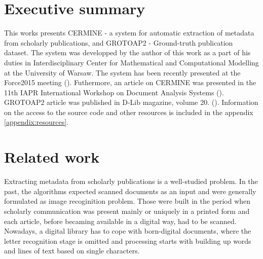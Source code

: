 \section{Executive summary}
This works presents CERMINE - a system for automatic extraction of metadata from scholarly publications, and GROTOAP2 - Ground-truth publication dataset. The system was developped by the author of this work as a part of his duties in Interdisciplinary Center for Mathematical and Computational Modelling at the University of Warsaw. The system has been recently presented at the Force2015 meeting (\cite{Force2015}). Futhermore, an article on CERMINE was presented in the 11th IAPR International Workshop on Document Analysis Systems (\cite{DominikaTkaczykPaweSzostekMateuszFedoryszakPiotrJanDendek2014}). GROTOAP2 article was published in D-Lib magazine, volume 20. (\cite{DominikaTkaczykPaweSzostek2014}).
Information on the access to the source code and other resources is included in the appendix \ref{appendix:resources}.
\section{Related work}
Extracting metadata from scholarly publications is a well-studied problem. In the past, the algorithms expected scanned documents as an input and were generally formulated as image recoginition problem. Those were built in the period when scholarly communication was present mainly or uniquely in a printed form and each article, before becaming available in a digital way, had to be scanned.
Nowadays, a digital library has to cope with born-digital documents, where the letter recognition stage is omitted and processing starts with building up words and lines of text based on single characters.



